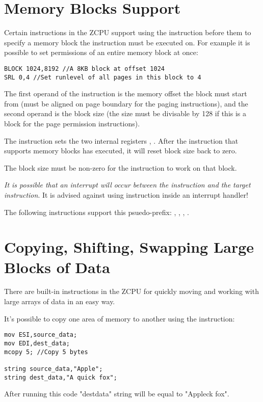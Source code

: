 \section{Memory Blocks Support}
Certain instructions in the ZCPU support using the  instruction before them to specify a memory block the instruction must be executed on. For example it is possible to set permissions of an entire memory block at once:
\begin{verbatim}
BLOCK 1024,8192 //A 8KB block at offset 1024
SRL 0,4 //Set runlevel of all pages in this block to 4
\end{verbatim}

The first operand of the  instruction is the memory offset the block must start from (must be aligned on page boundary for the paging instructions), and the second operand is the block size (the size must be divisable by 128 if this is a block for the page permission instructions).

The  instruction sets the two internal registers , . After the instruction that supports memory blocks has executed, it will reset block size back to zero.

The block size must be non-zero for the instruction to work on that block.

\emph{It is possible that an interrupt will occur between the  instruction and the target instruction}. It is advised against using  instruction inside an interrupt handler!

The following instructions support this psuedo-prefix: , , , .

\section{Copying, Shifting, Swapping Large Blocks of Data}
There are built-in instructions in the ZCPU for quickly moving and working with large arrays of data in an easy way.

It's possible to copy one area of memory to another using the  instruction:
\begin{verbatim}
mov ESI,source_data;
mov EDI,dest_data;
mcopy 5; //Copy 5 bytes

string source_data,"Apple";
string dest_data,"A quick fox";
\end{verbatim}
After running this code "dest\textunderscore data" string will be equal to "Appleck fox".

